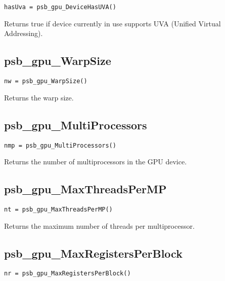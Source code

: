 \begin{verbatim}
hasUva = psb_gpu_DeviceHasUVA()
\end{verbatim}

Returns true if device currently in use supports UVA (Unified Virtual Addressing).

\subsection*{psb\_gpu\_WarpSize }

\begin{verbatim}
nw = psb_gpu_WarpSize()
\end{verbatim}

Returns the warp size.


\subsection*{psb\_gpu\_MultiProcessors }

\begin{verbatim}
nmp = psb_gpu_MultiProcessors()
\end{verbatim}

Returns the number of multiprocessors in the GPU device.

\subsection*{psb\_gpu\_MaxThreadsPerMP }

\begin{verbatim}
nt = psb_gpu_MaxThreadsPerMP()
\end{verbatim}

Returns the maximum number of threads per multiprocessor. 


\subsection*{psb\_gpu\_MaxRegistersPerBlock }

\begin{verbatim}
nr = psb_gpu_MaxRegistersPerBlock()
\end{verbatim}


